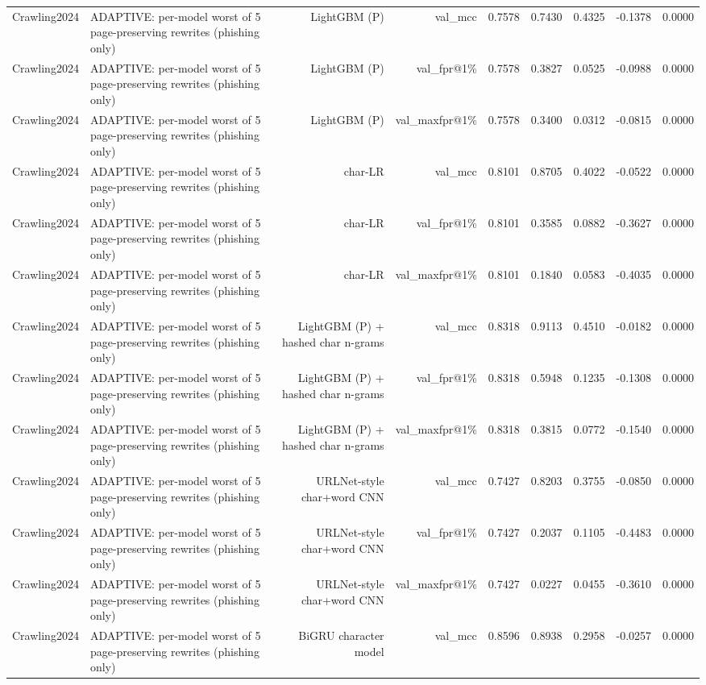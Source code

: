 \begin{table}[t]
\begin{tabular}{llrrrrrrr}
Crawling2024 & ADAPTIVE: per-model worst of 5 page-preserving rewrites (phishing only) & LightGBM (P) & val\_mcc & 0.7578 & 0.7430 & 0.4325 & -0.1378 & 0.0000 \\
Crawling2024 & ADAPTIVE: per-model worst of 5 page-preserving rewrites (phishing only) & LightGBM (P) & val\_fpr@1\% & 0.7578 & 0.3827 & 0.0525 & -0.0988 & 0.0000 \\
Crawling2024 & ADAPTIVE: per-model worst of 5 page-preserving rewrites (phishing only) & LightGBM (P) & val\_maxfpr@1\% & 0.7578 & 0.3400 & 0.0312 & -0.0815 & 0.0000 \\
Crawling2024 & ADAPTIVE: per-model worst of 5 page-preserving rewrites (phishing only) & char-LR & val\_mcc & 0.8101 & 0.8705 & 0.4022 & -0.0522 & 0.0000 \\
Crawling2024 & ADAPTIVE: per-model worst of 5 page-preserving rewrites (phishing only) & char-LR & val\_fpr@1\% & 0.8101 & 0.3585 & 0.0882 & -0.3627 & 0.0000 \\
Crawling2024 & ADAPTIVE: per-model worst of 5 page-preserving rewrites (phishing only) & char-LR & val\_maxfpr@1\% & 0.8101 & 0.1840 & 0.0583 & -0.4035 & 0.0000 \\
Crawling2024 & ADAPTIVE: per-model worst of 5 page-preserving rewrites (phishing only) & LightGBM (P) + hashed char n-grams & val\_mcc & 0.8318 & 0.9113 & 0.4510 & -0.0182 & 0.0000 \\
Crawling2024 & ADAPTIVE: per-model worst of 5 page-preserving rewrites (phishing only) & LightGBM (P) + hashed char n-grams & val\_fpr@1\% & 0.8318 & 0.5948 & 0.1235 & -0.1308 & 0.0000 \\
Crawling2024 & ADAPTIVE: per-model worst of 5 page-preserving rewrites (phishing only) & LightGBM (P) + hashed char n-grams & val\_maxfpr@1\% & 0.8318 & 0.3815 & 0.0772 & -0.1540 & 0.0000 \\
Crawling2024 & ADAPTIVE: per-model worst of 5 page-preserving rewrites (phishing only) & URLNet-style char+word CNN & val\_mcc & 0.7427 & 0.8203 & 0.3755 & -0.0850 & 0.0000 \\
Crawling2024 & ADAPTIVE: per-model worst of 5 page-preserving rewrites (phishing only) & URLNet-style char+word CNN & val\_fpr@1\% & 0.7427 & 0.2037 & 0.1105 & -0.4483 & 0.0000 \\
Crawling2024 & ADAPTIVE: per-model worst of 5 page-preserving rewrites (phishing only) & URLNet-style char+word CNN & val\_maxfpr@1\% & 0.7427 & 0.0227 & 0.0455 & -0.3610 & 0.0000 \\
Crawling2024 & ADAPTIVE: per-model worst of 5 page-preserving rewrites (phishing only) & BiGRU character model & val\_mcc & 0.8596 & 0.8938 & 0.2958 & -0.0257 & 0.0000 \\

\end{tabular}
\end{table}
